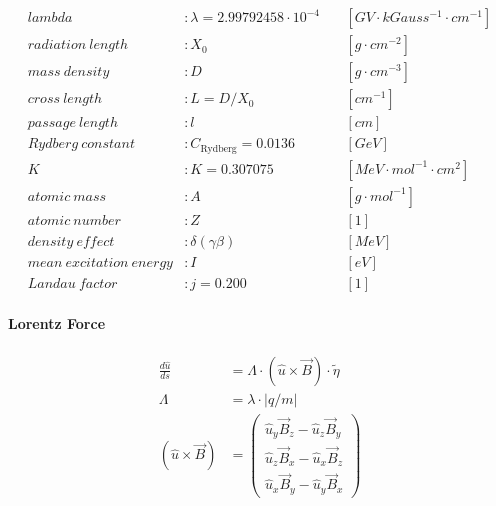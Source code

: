 \documentclass[review]{elsarticle}
\begin{document}
\begin{equation}
\begin{alignedat}{-1}
    lambda                   &: \lambda=2.99792458\cdot{10}^{-4}                \ &&[GV\cdot kGauss^{-1}\cdot {cm}^{-1}] \\
    radiation\ length        &: X_{0}                                           \ &&[g\cdot {cm}^{-2}]                   \\
    mass\ density            &: D                                               \ &&[g\cdot {cm}^{-3}]                   \\
    cross\ length            &: L=D/X_{0}                                       \ &&[{cm}^{-1}]                          \\
    passage\ length          &: l                                               \ &&[cm]                                 \\
    Rydberg\ constant        &: C_{\text{Rydberg}}=0.0136                       \ &&[GeV]                                \\
    K                        &: K=0.307075                                      \ &&[MeV\cdot {mol}^{-1}\cdot {cm}^{2}]  \\
    atomic\ mass             &: A                                               \ &&[g\cdot {mol}^{-1}]                  \\
    atomic\ number           &: Z                                               \ &&[1]                                  \\
    density\ effect          &: \delta(\gamma\beta)                             \ &&[MeV]                                \\
    mean\ excitation\ energy &: I                                               \ &&[eV]                                 \\
    Landau\ factor           &: j=0.200                                         \ &&[1]
\end{alignedat} \end{equation} 

\paragraph{Lorentz Force}
\begin{equation} \begin{alignedat}{-1}
    \frac{d\hat{u}}{ds}&=\Lambda\cdot(\hat{u}\times\vec{B})\cdot\tilde{\eta} \\
    \Lambda&=\lambda\cdot\bigl|q/m\bigr| \\
    (\hat{u}\times\vec{B})&=\left(\begin{array}{r}
        \hat{u}_{y}\vec{B}_{z}-\hat{u}_{z}\vec{B}_{y} \\
        \hat{u}_{z}\vec{B}_{x}-\hat{u}_{x}\vec{B}_{z} \\
        \hat{u}_{x}\vec{B}_{y}-\hat{u}_{y}\vec{B}_{x}
    \end{array}\right) \\
\end{alignedat} \end{equation} 
\end{document}
